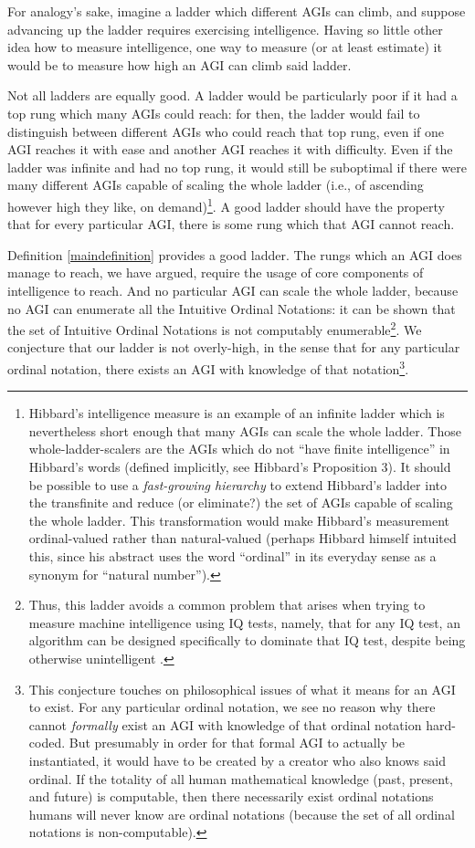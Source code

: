 \documentclass[runningheads]{llncs}
\begin{document}
For analogy's sake, imagine a ladder which different AGIs
can climb, and suppose advancing up the ladder requires exercising
intelligence. Having so little other idea how to measure
intelligence, one way to measure (or at least estimate) it would be
to measure how high an AGI can climb said ladder.

Not all ladders are equally good. A ladder would be particularly poor if it had
a top rung which many AGIs could reach: for then, the ladder would fail to
distinguish between different AGIs who could reach that top rung, even if one
AGI reaches it with ease and another AGI reaches it with difficulty.
Even if the ladder was infinite and had no top rung, it would still be suboptimal
if there were many different AGIs capable of scaling the whole
ladder (i.e., of ascending however high they like, on demand)\footnote{Hibbard's
intelligence measure
\cite{hibbard2011measuring} is an example of an infinite ladder
which is nevertheless short enough that many AGIs can
scale the whole ladder. Those whole-ladder-scalers are the AGIs which
do not ``have finite intelligence'' in Hibbard's words
(defined implicitly, see Hibbard's Proposition 3). It should be possible to
use a \emph{fast-growing hierarchy}
\cite{fairtlough1998hierarchies} \cite{weiermann2002slow}
to extend Hibbard's ladder into the transfinite and reduce (or eliminate?)
the set of AGIs capable of scaling the whole ladder. This transformation would make
Hibbard's measurement ordinal-valued rather than natural-valued
(perhaps Hibbard himself intuited this, since his abstract uses the
word ``ordinal''
in its everyday sense as a synonym for ``natural number'').}.
A good ladder
should have the property that for every particular AGI, there is some rung which
that AGI cannot reach.

Definition \ref{maindefinition} provides a good ladder.
The rungs which an AGI does
manage to reach, we have argued, require the usage of core components of intelligence
to reach.
And no particular AGI can scale
the whole ladder,
because no AGI can enumerate all the Intuitive Ordinal Notations: it can
be shown
that the set of Intuitive Ordinal Notations is not computably enumerable\footnote{Thus,
this ladder avoids a common problem that arises when
trying to measure machine intelligence using IQ tests, namely, that for any IQ test,
an algorithm can be designed specifically to dominate that
IQ test, despite being otherwise unintelligent \cite{besold2015can}.}.
We conjecture that our ladder is not overly-high, in the sense that for any
particular ordinal notation, there exists an AGI with knowledge of
that notation\footnote{This conjecture touches on philosophical issues of what it
means for an AGI to exist. For any particular ordinal notation, we see no reason
why there cannot \emph{formally} exist an AGI with knowledge of that ordinal notation
hard-coded. But presumably in order for that formal AGI to actually be instantiated,
it would have to be created by a creator who also knows said ordinal. If the totality
of all human mathematical knowledge (past, present, and future) is computable,
then there necessarily exist ordinal notations humans will never know are ordinal
notations (because the set of all ordinal notations is non-computable).}.
\end{document}
